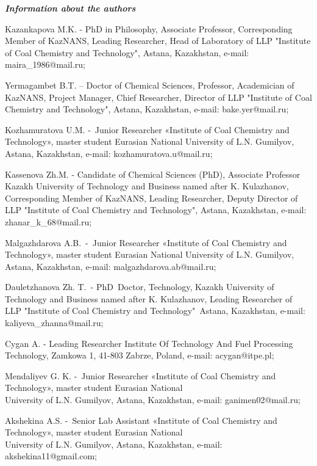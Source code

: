 \begin{authorinfo}
\hspace{1em}\emph{{\bfseries Information about the authors}}

Kazankapova M.K. - PhD in Philosophy, Associate Professor,
Corresponding Member of KazNANS, Leading Researcher, Head of Laboratory
of LLP "Institute of Coal Chemistry and Technology", Astana, Kazakhstan,
e-mail: maira\_1986@mail.ru;

Yermagambet B.T. -- Doctor of Chemical Sciences, Professor, Academician
of KazNANS, Project Manager, Chief Researcher, Director of LLP
"Institute of Coal Chemistry and Technology", Astana, Kazakhstan,
e-mail: bake.yer@mail.ru;

Kozhamuratova U.M. -~Junior Researcher «Institute of Coal Chemistry and
Technology», master student Eurasian National University of L.N.
Gumilyov, Astana, Kazakhstan, e-mail: kozhamuratova.u@mail.ru;

Kassenova Zh.M. - Candidate of Chemical Sciences (PhD), Associate
Professor Kazakh University of Technology and Business named after K.
Kulazhanov, Corresponding Member of KazNANS, Leading Researcher, Deputy
Director of LLP "Institute of Coal Chemistry and Technology", Astana,
Kazakhstan, e-mail: zhanar\_k\_68@mail.ru;

Malgazhdarova A.B.~-~Junior Researcher «Institute of Coal Chemistry and
Technology», master student Eurasian National University of L.N.
Gumilyov, Astana, Kazakhstan, e-mail: malgazhdarova.ab@mail.ru;

Dauletzhanova Zh. T.~- PhD~Doctor, Technology, Kazakh University of
Technology and Business named after K. Kulazhanov, Leading Researcher
of~ LLP "Institute of Coal Chemistry and Technology"~Astana,
Kazakhstan, e-mail: \\kaliyeva\_zhanna@mail.ru;

Cygan A. - Leading Researcher Institute Of Technology And Fuel
Processing Technology, Zamkowa 1, 41-803 Zabrze, Poland,
e-mail: acygan@itpe.pl;

Mendaliyev G. K. -~Junior Researcher «Institute of Coal Chemistry and
Technology», master student Eurasian National \\University of L.N.
Gumilyov, Astana, Kazakhstan, e-mail: ganimen02@mail.ru;

Akshekina A.S. -~Senior Lab Assistant «Institute of Coal Chemistry and
Technology», master student Eurasian National \\University of L.N.
Gumilyov, Astana, Kazakhstan, e-mail: akshekina11@gmail.com;


\end{authorinfo}

